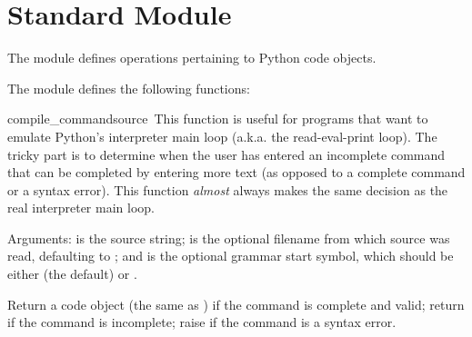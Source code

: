 \section{Standard Module }
\label{module-code}

The  module defines operations pertaining to Python code
objects.

The  module defines the following functions:

\renewcommand{\indexsubitem}{(in module code)}

\begin{funcdesc}{compile_command}{source\,
}
This function is useful for programs that want to emulate Python's
interpreter main loop (a.k.a. the read-eval-print loop).  The tricky
part is to determine when the user has entered an incomplete command
that can be completed by entering more text (as opposed to a complete
command or a syntax error).  This function \emph{almost} always makes
the same decision as the real interpreter main loop.

Arguments:  is the source string;  is the
optional filename from which source was read, defaulting to
; and  is the optional grammar start
symbol, which should be either  (the default) or
.

Return a code object (the same as ) if the command is complete and valid;
return  if the command is incomplete; raise
 if the command is a syntax error.


\end{funcdesc}
